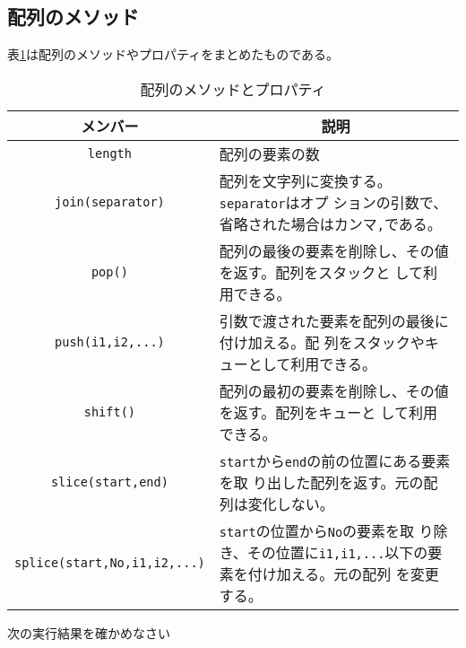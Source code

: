 \subsection{配列のメソッド}
表\ref{arrayPropMethod}は配列のメソッドやプロパティをまとめたものである。
\begin{table}[ht]
\caption{配列のメソッドとプロパティ}\label{arrayPropMethod}
\begin{center}
 \begin{tabular}{|c|m{}|}\hline
 メンバー&\multicolumn{1}{c|}{説明} \\\hline
  \Verb+length+ &配列の要素の数\\ \hline
  \Verb+join(separator)+& 配列を文字列に変換する。\Verb+separator+はオプ
      ションの引数で、省略された場合はカンマ\Verb+,+である。\\ \hline
  \Verb+pop()+& 配列の最後の要素を削除し、その値を返す。配列をスタックと
      して利用できる。\\ \hline
  \Verb+push(i1,i2,...)+& 引数で渡された要素を配列の最後に付け加える。配
      列をスタックやキューとして利用できる。\\ \hline
  \Verb+shift()+&配列の最初の要素を削除し、その値を返す。配列をキューと
      して利用できる。\\ \hline
  \Verb+slice(start,end)+&\Verb+start+から\Verb+end+の前の位置にある要素を取
      り出した配列を返す。元の配列は変化しない。\\ \hline
  \Verb+splice(start,No,i1,i2,...)+&\Verb+start+の位置から\Verb+No+の要素を取
      り除き、その位置に\Verb+i1,i1,...+以下の要素を付け加える。元の配列
      を変更する。\\ \hline
\end{tabular}
\end{center}
\end{table}
\begin{Exec}\upshape
 次の実行結果を確かめなさい
\end{Exec}

